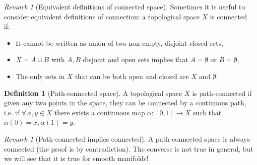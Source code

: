 \documentclass[a4paper,11pt,titlepage, article, oneside]{memoir}
\numberwithin{equation}{section}
\theoremstyle{definition}
\newtheorem{definition}[theorem]{Definition}
\theoremstyle{remark}
\newtheorem{remark}[theorem]{Remark}
\begin{document}
\begin{remarkbox}
\begin{remark}[Equivalent definitions of connected space]
Sometimes it is useful to consider equivalent definitions of connection: a topological space $X$ is connected if:
\begin{itemize}
\item It cannot be written as union of two non-empty, disjoint closed sets,
\item $X = A \cup B$ with $A, B$ disjoint and open sets implies that $A= \emptyset$ or $B = \emptyset$,
\item The only sets in $X$ that can be both open and closed are $X$ and $\emptyset$.
\end{itemize}
\end{remark}
\end{remarkbox}

\begin{definition}[Path-connected space]
A topological space $X$ is path-connected if given any two points in the space, they can be connected by a continuous path, i.e. if $\forall\, x, y \in X$ there exists a continuous map $\alpha \colon [0,1] \rightarrow X$ such that $\alpha(0)=x, \alpha(1)=y$. 
\end{definition}

\begin{remarkbox}\begin{remark}[Path-connected implies connected]
A path-connected space is always connected (the proof is by contradiction). The converse is not true in general, but we will see that it is true for smooth manifolds!
\end{remark}\end{remarkbox}
\end{document}
